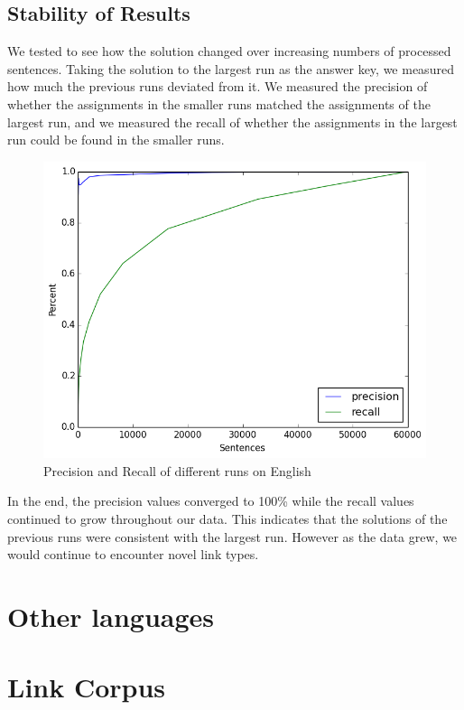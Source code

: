 \documentclass[11pt]{article}
\begin{document}
\subsection{Stability of Results}
We tested to see how the solution changed over increasing numbers of processed sentences. 
Taking the solution to the largest run as the answer key, we measured how much the previous runs deviated from it. We measured the precision of whether the assignments in the smaller runs matched the assignments of the largest run, and we measured the recall of whether the assignments in the largest run could be found in the smaller runs. 

\begin{figure}[ht!]
  \includegraphics[width=\linewidth, keepaspectratio=true]{figure/precision_recall.png}
  \caption{Precision and Recall of different runs on English}
\end{figure}

In the end, the precision values converged to 100\% while the recall values continued to grow throughout our data. This indicates that the solutions of the previous runs were consistent with the largest run. However as the data grew, we would continue to encounter novel link types.



\section{Other languages}




\section{Link Corpus}
\end{document}
